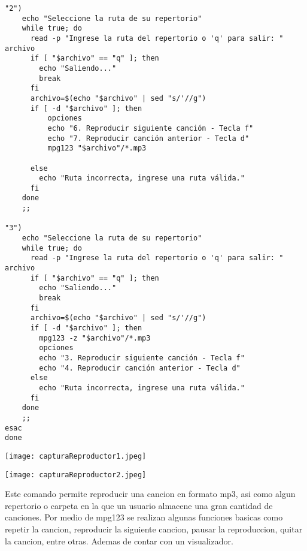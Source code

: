 \documentclass{article}
\begin{document}
\begin{verbatim}
"2")
    echo "Seleccione la ruta de su repertorio"
    while true; do
      read -p "Ingrese la ruta del repertorio o 'q' para salir: " archivo
      if [ "$archivo" == "q" ]; then
        echo "Saliendo..."
        break
      fi
      archivo=$(echo "$archivo" | sed "s/'//g")
      if [ -d "$archivo" ]; then
          opciones
          echo "6. Reproducir siguiente canción - Tecla f"
          echo "7. Reproducir canción anterior - Tecla d"
          mpg123 "$archivo"/*.mp3
        
      else
        echo "Ruta incorrecta, ingrese una ruta válida."
      fi
    done
    ;;

"3")
    echo "Seleccione la ruta de su repertorio"
    while true; do
      read -p "Ingrese la ruta del repertorio o 'q' para salir: " archivo
      if [ "$archivo" == "q" ]; then
        echo "Saliendo..."
        break
      fi
      archivo=$(echo "$archivo" | sed "s/'//g")
      if [ -d "$archivo" ]; then
        mpg123 -z "$archivo"/*.mp3
        opciones
        echo "3. Reproducir siguiente canción - Tecla f"
        echo "4. Reproducir canción anterior - Tecla d"
      else
        echo "Ruta incorrecta, ingrese una ruta válida."
      fi
    done
    ;;
esac
done

\end{verbatim}

\texttt{[image: capturaReproductor1.jpeg]}

\texttt{[image: capturaReproductor2.jpeg]}

\vspace{1cm}
\fontsize{12}{6}\selectfont
\textbf{}

Este comando permite reproducir una cancion en formato mp3, asi como algun repertorio o carpeta en la que un usuario almacene una gran cantidad de canciones. Por medio de mpg123 se realizan algunas funciones basicas como repetir la cancion, reproducir la siguiente cancion, pausar la reproduccion, quitar la cancion, entre otras. Ademas de contar con un visualizador.

\newpage
\end{document}
